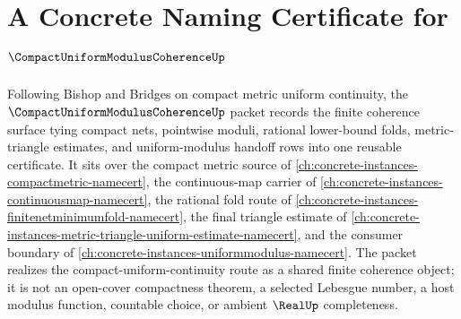 \chapter{A Concrete Naming Certificate for $\CompactUniformModulusCoherenceUp$}
\label{ch:concrete-instances-compact-uniform-modulus-coherence-namecert}

Following Bishop and Bridges on compact metric uniform continuity, the $\CompactUniformModulusCoherenceUp$ packet records the finite coherence surface tying compact nets, pointwise moduli, rational lower-bound folds, metric-triangle estimates, and uniform-modulus handoff rows into one reusable certificate. It sits over the compact metric source of \autoref{ch:concrete-instances-compactmetric-namecert}, the continuous-map carrier of \autoref{ch:concrete-instances-continuousmap-namecert}, the rational fold route of \autoref{ch:concrete-instances-finitenetminimumfold-namecert}, the final triangle estimate of \autoref{ch:concrete-instances-metric-triangle-uniform-estimate-namecert}, and the consumer boundary of \autoref{ch:concrete-instances-uniformmodulus-namecert}. The packet realizes the compact-uniform-continuity route as a shared finite coherence object; it is not an open-cover compactness theorem, a selected Lebesgue number, a host modulus function, countable choice, or ambient $\RealUp$ completeness.

